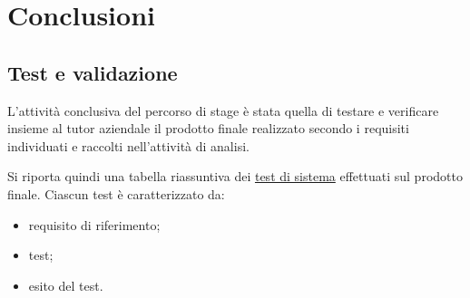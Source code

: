 \chapter{Conclusioni}
\label{cap:conclusioni}


\setlength{\parskip}{3ex}

\section{Test e validazione}
L'attività conclusiva del percorso di stage è stata quella di testare e verificare insieme al tutor aziendale il prodotto finale realizzato secondo i requisiti individuati e raccolti nell'attività di analisi.

\setlength{\parskip}{3ex} 

\noindent Si riporta quindi una tabella riassuntiva dei {\hyperref[para:test-definition]{test di sistema}}\glsfirstoccur \; effettuati sul prodotto finale. Ciascun test è caratterizzato da:
\begin{itemize}
\item requisito di riferimento;
\item test;
\item esito del test.
\end{itemize}

\pagebreak

